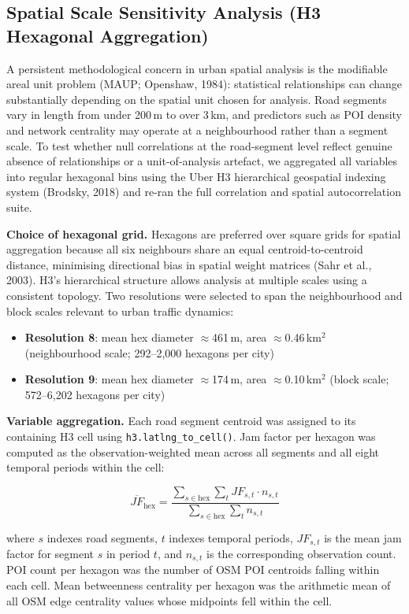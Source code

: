 \documentclass[12pt,a4paper]{article}
\begin{document}
\subsection{Spatial Scale Sensitivity Analysis (H3 Hexagonal Aggregation)}
\label{sec:method_h3}

A persistent methodological concern in urban spatial analysis is the modifiable areal unit problem (MAUP; Openshaw, 1984): statistical relationships can change substantially depending on the spatial unit chosen for analysis. Road segments vary in length from under 200\,m to over 3\,km, and predictors such as POI density and network centrality may operate at a neighbourhood rather than a segment scale. To test whether null correlations at the road-segment level reflect genuine absence of relationships or a unit-of-analysis artefact, we aggregated all variables into regular hexagonal bins using the Uber H3 hierarchical geospatial indexing system (Brodsky, 2018) and re-ran the full correlation and spatial autocorrelation suite.

\textbf{Choice of hexagonal grid.} Hexagons are preferred over square grids for spatial aggregation because all six neighbours share an equal centroid-to-centroid distance, minimising directional bias in spatial weight matrices (Sahr et al., 2003). H3's hierarchical structure allows analysis at multiple scales using a consistent topology. Two resolutions were selected to span the neighbourhood and block scales relevant to urban traffic dynamics:

\begin{itemize}
  \item \textbf{Resolution 8}: mean hex diameter $\approx$461\,m, area $\approx$0.46\,km$^2$ (neighbourhood scale; 292--2,000 hexagons per city)
  \item \textbf{Resolution 9}: mean hex diameter $\approx$174\,m, area $\approx$0.10\,km$^2$ (block scale; 572--6,202 hexagons per city)
\end{itemize}

\textbf{Variable aggregation.} Each road segment centroid was assigned to its containing H3 cell using \texttt{h3.latlng\_to\_cell()}. Jam factor per hexagon was computed as the observation-weighted mean across all segments and all eight temporal periods within the cell:

\[\overline{JF}_{\text{hex}} = \frac{\displaystyle\sum_{s \in \text{hex}} \sum_{t} JF_{s,t} \cdot n_{s,t}}{\displaystyle\sum_{s \in \text{hex}} \sum_{t} n_{s,t}}\]

where $s$ indexes road segments, $t$ indexes temporal periods, $JF_{s,t}$ is the mean jam factor for segment $s$ in period $t$, and $n_{s,t}$ is the corresponding observation count. POI count per hexagon was the number of OSM POI centroids falling within each cell. Mean betweenness centrality per hexagon was the arithmetic mean of all OSM edge centrality values whose midpoints fell within the cell.
\end{document}
